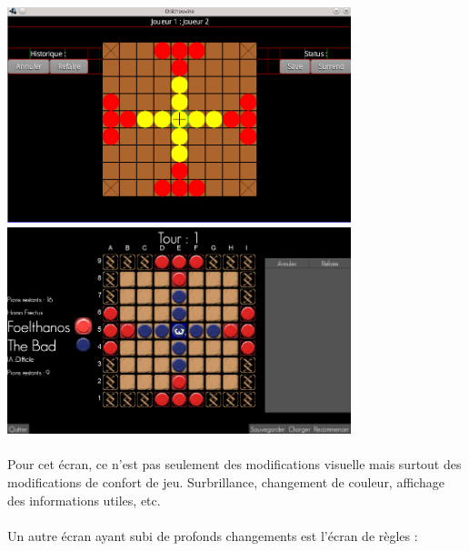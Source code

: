\documentclass[11pt]{article} %
\begin{document}
\begin{center}
\includegraphics[width=10cm]{snapshot5.png}
\includegraphics[width=10cm]{validDoc3.jpg}
\end{center}

\paragraph{}
Pour cet écran, ce n'est pas seulement des modifications visuelle mais surtout des modifications de confort de jeu. Surbrillance, changement de couleur, affichage des informations utiles, etc.
\paragraph{}
Un autre écran ayant subi de profonds changements est l'écran de règles :
\end{document}
